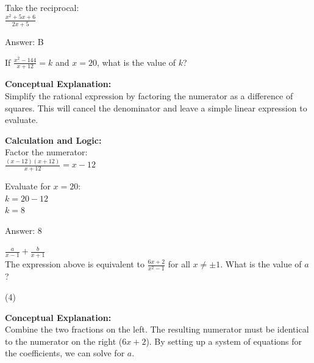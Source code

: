 \documentclass[11pt,paper=a4,answers]{exam}
\begin{document}
\begin{questions}
\begin{solution}
Take the reciprocal: \\
$\frac{x^2+5x+6}{2x+5}$

\vspace{25pt}

Answer: \colorbox{yellow!100}{B}
\end{solution}

\vspace{40pt}

\question
If $\frac{x^2 - 144}{x + 12} = k$ and $x = 20$, what is the value of $k$?

\begin{solution}
\textbf{Conceptual Explanation:} \\
Simplify the rational expression by factoring the numerator as a difference of squares. This will cancel the denominator and leave a simple linear expression to evaluate.

\vspace{20pt}

\textbf{Calculation and Logic:} \\
Factor the numerator: \\
$\frac{(x-12)(x+12)}{x+12} = x - 12$

\vspace{10pt}

Evaluate for $x = 20$: \\
$k = 20 - 12$ \\
$k = 8$

\vspace{25pt}

Answer: \colorbox{yellow!100}{8}
\end{solution}

\vspace{40pt}

\question
$\frac{a}{x-1} + \frac{b}{x+1}$ \\
The expression above is equivalent to $\frac{6x+2}{x^2-1}$ for all $x \neq \pm 1$. What is the value of $a$?
\begin{tasks}(4)
\end{tasks}

\begin{solution}
\textbf{Conceptual Explanation:} \\
Combine the two fractions on the left. The resulting numerator must be identical to the numerator on the right ($6x+2$). By setting up a system of equations for the coefficients, we can solve for $a$.


\end{solution}
\end{questions}
\end{document}
